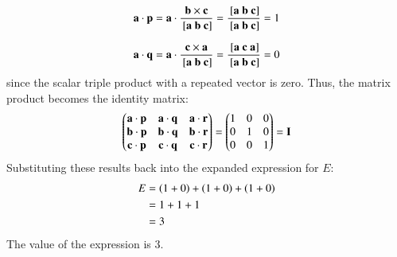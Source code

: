 \documentclass[journal]{IEEEtran}
\begin{document}
\begin{align}
    \vec{a} \cdot \vec{p} = \vec{a} \cdot \frac{\vec{b} \times \vec{c}}{\sbrak{\vec{a}\ \vec{b}\ \vec{c}}} = \frac{\sbrak{\vec{a}\ \vec{b}\ \vec{c}}}{\sbrak{\vec{a}\ \vec{b}\ \vec{c}}} = 1
\end{align}

\begin{align}
    \vec{a} \cdot \vec{q} = \vec{a} \cdot \frac{\vec{c} \times \vec{a}}{\sbrak{\vec{a}\ \vec{b}\ \vec{c}}} = \frac{\sbrak{\vec{a}\ \vec{c}\ \vec{a}}}{\sbrak{\vec{a}\ \vec{b}\ \vec{c}}} = 0
\end{align}
since the scalar triple product with a repeated vector is zero.
Thus, the matrix product becomes the identity matrix:
\begin{align}
    \begin{pmatrix}\mathbf{a} \cdot \mathbf{p} & \mathbf{a} \cdot \mathbf{q} & \mathbf{a} \cdot \mathbf{r} \\
        \mathbf{b} \cdot \mathbf{p} & \mathbf{b} \cdot \mathbf{q} & \mathbf{b} \cdot \mathbf{r} \\
        \mathbf{c} \cdot \mathbf{p} & \mathbf{c} \cdot \mathbf{q} & \mathbf{c} \cdot \mathbf{r}\end{pmatrix}
    =\begin{pmatrix}1 & 0 & 0 \\
        0 & 1 & 0 \\
        0 & 0 & 1\end{pmatrix} = \mathbf{I}
\end{align}
Substituting these results back into the expanded expression for $E$:
\begin{align}
    E &= \left(1 + 0\right) + \left(1 + 0\right) + \left(1 + 0\right) \\
      &= 1 + 1 + 1 \\
      &= 3
\end{align}
The value of the expression is 3.
\end{document}
